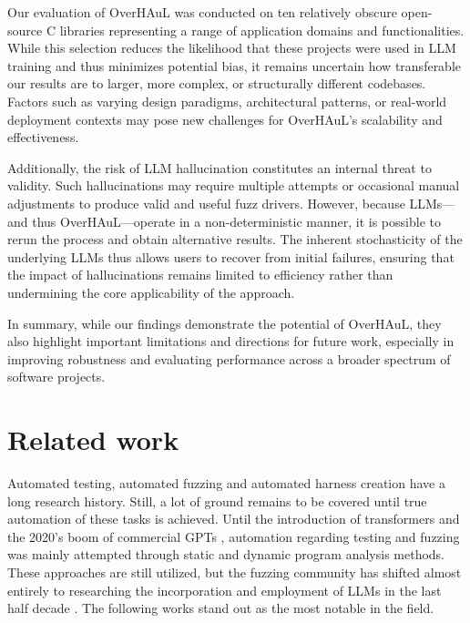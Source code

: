 \documentclass[
  a4paper,
]{scrreprt}
\theoremstyle{definition}
\theoremstyle{remark}
\begin{document}
Our evaluation of OverHAuL was conducted on ten relatively obscure
open-source C libraries representing a range of application domains and
functionalities. While this selection reduces the likelihood that these
projects were used in LLM training and thus minimizes potential bias, it
remains uncertain how transferable our results are to larger, more
complex, or structurally different codebases. Factors such as varying
design paradigms, architectural patterns, or real-world deployment
contexts may pose new challenges for OverHAuL's scalability and
effectiveness.

Additionally, the risk of LLM hallucination constitutes an internal
threat to validity. Such hallucinations may require multiple attempts or
occasional manual adjustments to produce valid and useful fuzz drivers.
However, because LLMs---and thus OverHAuL---operate in a
non-deterministic manner, it is possible to rerun the process and obtain
alternative results. The inherent stochasticity of the underlying LLMs
thus allows users to recover from initial failures, ensuring that the
impact of hallucinations remains limited to efficiency rather than
undermining the core applicability of the approach.

In summary, while our findings demonstrate the potential of OverHAuL,
they also highlight important limitations and directions for future
work, especially in improving robustness and evaluating performance
across a broader spectrum of software projects.


\chapter{Related work}\label{sec-related}

Automated testing, automated fuzzing and automated harness creation have
a long research history. Still, a lot of ground remains to be covered
until true automation of these tasks is achieved. Until the introduction
of transformers \autocite{vaswani2023} and the 2020's boom of commercial
GPTs \autocite{chatgpt}, automation regarding testing and fuzzing was
mainly attempted through static and dynamic program analysis methods.
These approaches are still utilized, but the fuzzing community has
shifted almost entirely to researching the incorporation and employment
of LLMs in the last half decade
\autocite{iris,sun2024,prophetfuzz,oss-fuzz-gen,green2022,utopia,fuzzgpt,titanfuzz,fuzzgen,fudge}.
The following works stand out as the most notable in the field.
\end{document}
